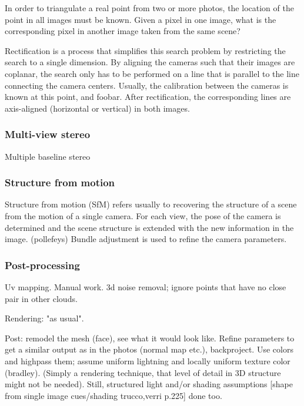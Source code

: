 In order to triangulate a real point from two or more photos, the location of the point in all images must be known.
Given a pixel in one image, what is the corresponding pixel in another image taken from the same scene?

Rectification is a process that simplifies this search problem by restricting the search to a single dimension.
By aligning the cameras such that their images are coplanar, the search only has to be performed on a line that is parallel to the line connecting the camera centers.
Usually, the calibration between the cameras is known at this point, and foobar.
After rectification, the corresponding lines are axis-aligned (horizontal or vertical) in both images.


\subsubsection{Multi-view stereo}

Multiple baseline stereo \cite{okutomi1993multiple}

\subsubsection{Structure from motion}

Structure from motion (SfM) refers usually to recovering the structure of a scene from the motion of a single camera.
For each view, the pose of the camera is determined and the scene structure is extended with the new information in the image.
(pollefeys)
Bundle adjustment is used to refine the camera parameters.

\subsubsection{Post-processing}

Uv mapping. Manual work. 3d noise removal; ignore points that have no close pair in other clouds.

Rendering: "as usual".

Post: remodel the mesh (face), see what it would look like. Refine parameters to get a similar output as in the photos (normal map etc.), backproject. Use colors and highpass them; assume uniform lightning and locally uniform texture color (bradley). (Simply a rendering technique, that level of detail in 3D structure might not be needed). Still, structured light and/or shading assumptions [shape from single image cues/shading trucco,verri p.225] done too.


